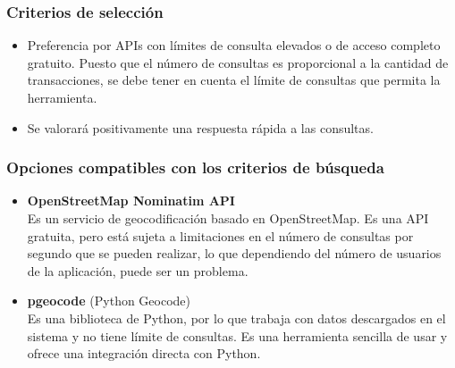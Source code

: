 \subsubsection{Criterios de selección}
\begin{itemize}
    \item Preferencia por APIs con límites de consulta elevados o de acceso completo gratuito. Puesto que el número de consultas es proporcional a la cantidad de transacciones, se debe tener en cuenta el límite de consultas que permita la herramienta.
    \item Se valorará positivamente una respuesta rápida a las consultas.
\end{itemize}

\subsubsection{Opciones compatibles con los criterios de búsqueda}
\begin{itemize}
    \item \textbf{OpenStreetMap Nominatim API}\\
    Es un servicio de geocodificación basado en OpenStreetMap. Es una API gratuita, pero está sujeta a limitaciones en el número de consultas por segundo que se pueden realizar, lo que dependiendo del número de usuarios de la aplicación, puede ser un problema.
    \item \textbf{pgeocode} (Python Geocode)\\
    Es una biblioteca de Python, por lo que trabaja con datos descargados en el sistema y no tiene límite de consultas. Es una herramienta sencilla de usar y ofrece una integración directa con Python.
\end{itemize}

